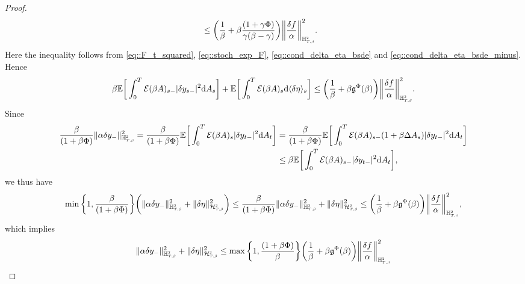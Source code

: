 \documentclass[10pt]{article} %
\newcommand\cE{\mathcal E}
\newcommand\cH{\mathcal H}
\newcommand{\smalltext}[1]{\text{\fontsize{4}{4}\selectfont$#1$}}
\newcommand\fg{\mathfrak g}
\def \E{\mathbb{E}}
\def \H{\mathbb{H}}
\newcommand{\1}{\mathbf{1}}
\def\d{\mathrm{d}}
\begin{document}
\begin{proof}
\begin{align*}
		&\leq \bigg(\frac{1}{\beta} + \beta\frac{(1+\gamma\Phi)}{\gamma(\beta-\gamma)}\bigg) \bigg\|\frac{\delta f}{\alpha}\bigg\|^2_{\H^\smalltext{2}_{\smalltext{T}\smalltext{,}\smalltext{\beta}}}.
	\end{align*}
	Here the inequality follows from \eqref{eq::F_t_squared}, \eqref{eq::stoch_exp_F}, \eqref{eq::cond_delta_eta_bsde} and \eqref{eq::cond_delta_eta_bsde_minus}. Hence
	\begin{equation*}
		\beta \E\bigg[\int_0^T \cE(\beta A)_{s-}|\delta y_{s-}|^2\d A_s\bigg] + \E\bigg[\int_0^T \cE(\beta A)_s \d \langle\delta\eta\rangle_s\bigg] \leq \bigg(\frac{1}{\beta} + \beta \fg^\Phi(\beta)\bigg) \bigg\|\frac{\delta f}{\alpha}\bigg\|^2_{\H^\smalltext{2}_{\smalltext{T}\smalltext{,}\smalltext{\beta}}}.
	\end{equation*}
	 Since
	\begin{align*}
		\frac{\beta}{(1+\beta\Phi)}\|\alpha\delta y_{-}\|^2_{\H^\smalltext{2}_{\smalltext{T}\smalltext{,}\smalltext{\beta}}} = \frac{\beta}{(1+\beta\Phi)} \E\bigg[\int_0^T \cE(\beta A)_{s}|\delta y_{t-}|^2\d A_t\bigg] 
		&= \frac{\beta}{(1+\beta\Phi)} \E\bigg[\int_0^T \cE(\beta A)_{s-}(1+\beta\Delta A_s)|\delta y_{t-}|^2\d A_t\bigg] \\
		&\leq \beta \E\bigg[\int_0^T \cE(\beta A)_{s-}|\delta y_{t-}|^2\d A_t\bigg],
	\end{align*}
	we thus have
	\begin{equation*}
		\min\bigg\{1,\frac{\beta}{(1+\beta\Phi)}\bigg\} \bigg(\|\alpha\delta y_{-}\|^2_{\H^\smalltext{2}_{\smalltext{T}\smalltext{,}\smalltext{\beta}}} + \|\delta\eta\|^2_{\cH^\smalltext{2}_{\smalltext{T}\smalltext{,}\smalltext{\beta}}}\bigg) 
		\leq \frac{\beta}{(1+\beta\Phi)}\|\alpha\delta y_{-}\|^2_{\H^\smalltext{2}_{\smalltext{T}\smalltext{,}\smalltext{\beta}}} + \|\delta\eta\|^2_{\cH^\smalltext{2}_{\smalltext{T}\smalltext{,}\smalltext{\beta}}} 
		\leq \bigg(\frac{1}{\beta} + \beta \fg^\Phi(\beta)\bigg) \bigg\|\frac{\delta f}{\alpha}\bigg\|^2_{\H^\smalltext{2}_{\smalltext{T}\smalltext{,}\smalltext{\beta}}},
	\end{equation*}
	which implies
	\begin{equation*}
		\|\alpha\delta y_{-}\|^2_{\H^\smalltext{2}_{\smalltext{T}\smalltext{,}\smalltext{\beta}}} + \|\delta\eta\|^2_{\cH^\smalltext{2}_{\smalltext{T}\smalltext{,}\smalltext{\beta}}}  
		\leq \max\bigg\{1,\frac{(1+\beta\Phi)}{\beta}\bigg\}\bigg(\frac{1}{\beta} + \beta \fg^\Phi(\beta)\bigg) \bigg\|\frac{\delta f}{\alpha}\bigg\|^2_{\H^\smalltext{2}_{\smalltext{T}\smalltext{,}\smalltext{\beta}}}

\end{equation*}
\end{proof}
\end{document}
